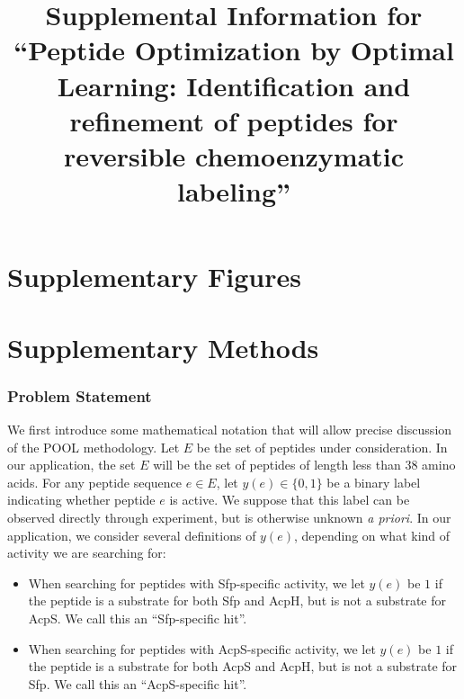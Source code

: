 \documentclass[11pt]{article}
\begin{document}
\title{Supplemental Information for \enquote{Peptide Optimization by Optimal Learning: 
Identification and refinement of peptides for reversible chemoenzymatic labeling}}
\maketitle
\tableofcontents
\newpage
\part{Supplementary Figures}
\part{Supplementary Methods}
\section{Problem Statement}



We first introduce some mathematical notation that will allow precise discussion of the POOL methodology. Let $E$ be the set of peptides under consideration.
In our application, the set $E$ will be the set of peptides of length less than 38 amino acids.
For any peptide sequence $e \in E$, let $y(e) \in \{0, 1\}$ be a binary label indicating whether
peptide $e$ is active.  We suppose that this label can be observed directly through experiment, but is otherwise unknown {\it a priori}.
In our application, we consider several definitions of $y(e)$, depending on what kind of activity we are searching for:
\begin{itemize}
\item When searching for peptides with Sfp-specific activity, we let $y(e)$ be $1$ if the peptide is a substrate for both Sfp and AcpH, but is not a substrate for AcpS.  We call this an \enquote{Sfp-specific hit}.
\item When searching for peptides with AcpS-specific activity, we let $y(e)$ be $1$ if the peptide is a substrate for both AcpS and AcpH, but is not a substrate for Sfp.  We call this an \enquote{AcpS-specific hit}.
\end{itemize}
\end{document}
